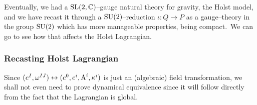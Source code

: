 Eventually, we had a $\text{\normalfont SL}(2,\mathbb{C})$--gauge natural theory for gravity, the Holst model, and we have recast it through a $\text{\normalfont SU}(2)$--reduction $\iota:Q\to P$ as a gauge--theory in the group $\text{\normalfont SU}(2)$ which has more manageable properties, being compact.\, We can go to see how that affects the Holst Lagrangian.

\subsubsection{Recasting Holst Lagrangian}
Since $(e^I,\omega^{IJ})\leftrightarrow(e^0,e^i,\text{\normalfont A}^i,\kappa^i)$ is just an (algebraic) field transformation, we shall not even need to prove dynamical equivalence since it will follow directly from the fact that the Lagrangian is global.\\


